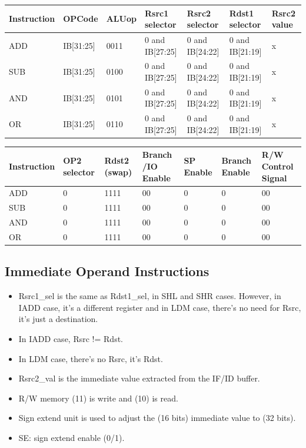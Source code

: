 \documentclass[12pt]{report}
\begin{document}
\begin{center}
\begin{tabular}{||p{20mm}| p{15mm}| p{15mm}| p{15mm}| p{15mm}| p{15mm}| p{15mm}||} 
\hline
Instruction & OPCode & ALUop & Rsrc1 selector & Rsrc2 selector & Rdst1 selector & Rsrc2 value  \\ [0.5ex] 
\hline\hline
ADD & IB[31:25] & 0011 & 0 and IB[27:25] & 0 and IB[24:22] & 0 and IB[21:19] & x \\
\hline
SUB & IB[31:25] & 0100 & 0 and IB[27:25] & 0 and IB[24:22] & 0 and IB[21:19] & x \\
\hline
AND & IB[31:25] & 0101 & 0 and IB[27:25] & 0 and IB[24:22] & 0 and IB[21:19] & x \\
\hline
OR  & IB[31:25] & 0110 & 0 and IB[27:25] & 0 and IB[24:22] & 0 and IB[21:19] & x \\
\hline
\end{tabular}
\end{center}

\begin{center}
\begin{tabular}{||p{20mm}| p{15mm}| p{15mm}| p{15mm}| p{15mm}| p{15mm}| p{15mm}||} 
\hline
Instruction & OP2 selector & Rdst2 (swap) & Branch /IO Enable & SP Enable & Branch Enable & R/W Control Signal  \\ [0.5ex] 
\hline\hline
ADD & 0 & 1111 & 00 & 0 & 0 & 00 \\
\hline
SUB & 0 & 1111 & 00 & 0 & 0 & 00 \\
\hline
AND & 0 & 1111 & 00 & 0 & 0 & 00 \\
\hline
OR  & 0 & 1111 & 00 & 0 & 0 & 00 \\
\hline
\end{tabular}
\end{center}

\subsection{Immediate Operand Instructions}
\begin{itemize}
    \item Rsrc1\_sel is the same as Rdst1\_sel, in SHL and SHR cases. However, in IADD case, it's a different register and in LDM case, there's no need for Rsrc, it's just a destination.
    \item In IADD case, Rsrc != Rdst.
    \item In LDM case, there's no Rsrc, it's Rdst.
    \item Rsrc2\_val is the immediate value extracted from the IF/ID buffer.
    \item R/W memory (11) is write and (10) is read.
    \item Sign extend unit is used to adjust the (16 bits) immediate value to (32 bits).
    \item SE: sign extend enable (0/1).
\end{itemize}
\end{document}
